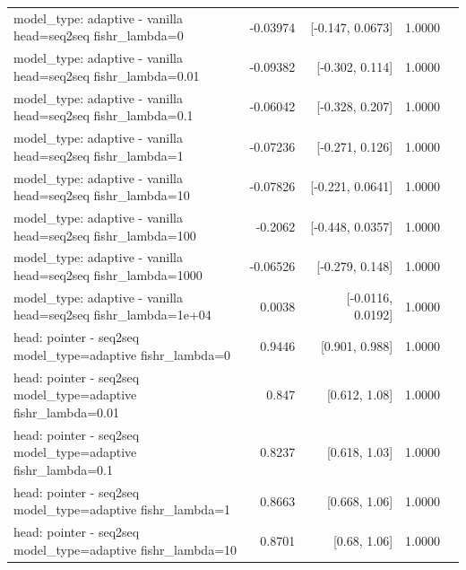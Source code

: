 \documentclass[10pt]{article}
\makeatletter
\newcommand{\stackcell}[1]{\begin{tabular}[t]{@{}l@{}}#1\end{tabular}}
\makeatother
\begin{document}
{\begin{longtable}{lrrrl}
\stackcell{model\_type: adaptive - vanilla\\\footnotesize head=seq2seq fishr\_lambda=0 } & -0.03974 & [-0.147, 0.0673] & 1.0000 & \\
\stackcell{model\_type: adaptive - vanilla\\\footnotesize head=seq2seq fishr\_lambda=0.01 } & -0.09382 & [-0.302, 0.114] & 1.0000 & \\
\stackcell{model\_type: adaptive - vanilla\\\footnotesize head=seq2seq fishr\_lambda=0.1 } & -0.06042 & [-0.328, 0.207] & 1.0000 & \\
\stackcell{model\_type: adaptive - vanilla\\\footnotesize head=seq2seq fishr\_lambda=1 } & -0.07236 & [-0.271, 0.126] & 1.0000 & \\
\stackcell{model\_type: adaptive - vanilla\\\footnotesize head=seq2seq fishr\_lambda=10 } & -0.07826 & [-0.221, 0.0641] & 1.0000 & \\
\stackcell{model\_type: adaptive - vanilla\\\footnotesize head=seq2seq fishr\_lambda=100 } & -0.2062 & [-0.448, 0.0357] & 1.0000 & \\
\stackcell{model\_type: adaptive - vanilla\\\footnotesize head=seq2seq fishr\_lambda=1000 } & -0.06526 & [-0.279, 0.148] & 1.0000 & \\
\stackcell{model\_type: adaptive - vanilla\\\footnotesize head=seq2seq fishr\_lambda=1e+04 } & 0.0038 & [-0.0116, 0.0192] & 1.0000 & \\
\stackcell{head: pointer - seq2seq\\\footnotesize model\_type=adaptive fishr\_lambda=0 } & 0.9446 & [0.901, 0.988] & 1.0000 & \\
\stackcell{head: pointer - seq2seq\\\footnotesize model\_type=adaptive fishr\_lambda=0.01 } & 0.847 & [0.612, 1.08] & 1.0000 & \\
\stackcell{head: pointer - seq2seq\\\footnotesize model\_type=adaptive fishr\_lambda=0.1 } & 0.8237 & [0.618, 1.03] & 1.0000 & \\
\stackcell{head: pointer - seq2seq\\\footnotesize model\_type=adaptive fishr\_lambda=1 } & 0.8663 & [0.668, 1.06] & 1.0000 & \\
\stackcell{head: pointer - seq2seq\\\footnotesize model\_type=adaptive fishr\_lambda=10 } & 0.8701 & [0.68, 1.06] & 1.0000 & \\

\end{longtable}}
\end{document}
